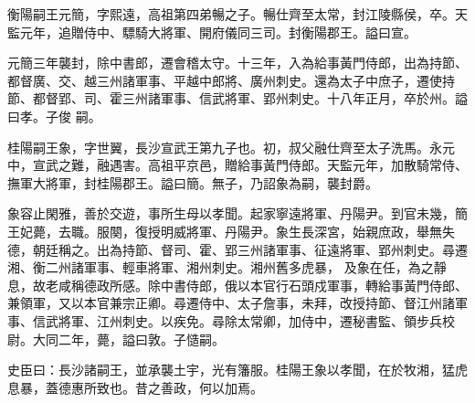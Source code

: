 \begin{pinyinscope}
 衡陽嗣王元簡，字熙遠，高祖第四弟暢之子。暢仕齊至太常，封江陵縣侯，卒。天監元年，追贈侍中、驃騎大將軍、開府儀同三司。封衡陽郡王。謚曰宣。



 元簡三年襲封，除中書郎，遷會稽太守。十三年，入為給事黃門侍郎，出為持節、都督廣、交、越三州諸軍事、平越中郎將、廣州刺史。還為太子中庶子，遷使持節、都督郢、司、霍三州諸軍事、信武將軍、郢州刺史。十八年正月，卒於州。謚曰孝。子俊
 嗣。



 桂陽嗣王象，字世翼，長沙宣武王第九子也。初，叔父融仕齊至太子洗馬。永元中，宣武之難，融遇害。高祖平京邑，贈給事黃門侍郎。天監元年，加散騎常侍、撫軍大將軍，封桂陽郡王。謚曰簡。無子，乃詔象為嗣，襲封爵。



 象容止閑雅，善於交遊，事所生母以孝聞。起家寧遠將軍、丹陽尹。到官未幾，簡王妃薨，去職。服闋，復授明威將軍、丹陽尹。象生長深宮，始親庶政，舉無失德，朝廷稱之。出為持節、督司、霍、郢三州諸軍事、征遠將軍、郢州刺史。尋遷湘、衡二州諸軍事、輕車將軍、湘州刺史。湘州舊多虎暴，
 及象在任，為之靜息，故老咸稱德政所感。除中書侍郎，俄以本官行石頭戍軍事，轉給事黃門侍郎、兼領軍，又以本官兼宗正卿。尋遷侍中、太子詹事，未拜，改授持節、督江州諸軍事、信武將軍、江州刺史。以疾免。尋除太常卿，加侍中，遷秘書監、領步兵校尉。大同二年，薨，謚曰敦。子慥嗣。



 史臣曰：長沙諸嗣王，並承襲土宇，光有籓服。桂陽王象以孝聞，在於牧湘，猛虎息暴，蓋德惠所致也。昔之善政，何以加焉。



\end{pinyinscope}